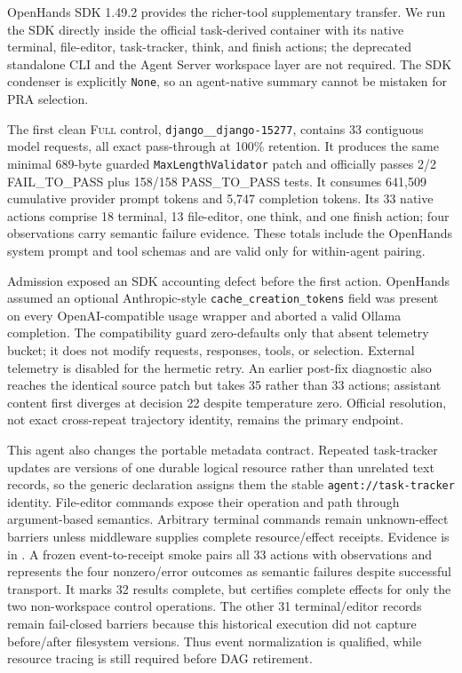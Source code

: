 \documentclass[11pt]{article}
\begin{document}
OpenHands SDK 1.49.2 provides the richer-tool supplementary transfer.  We run
the SDK directly inside the official task-derived container with its native
terminal, file-editor, task-tracker, think, and finish actions; the deprecated
standalone CLI and the Agent Server workspace layer are not required.  The SDK
condenser is explicitly \texttt{None}, so an agent-native summary cannot be
mistaken for PRA selection.

The first clean \textsc{Full} control, \texttt{django\_\_django-15277}, contains
33 contiguous model requests, all exact pass-through at 100\% retention.  It
produces the same minimal 689-byte guarded \texttt{MaxLengthValidator} patch
and officially passes 2/2 FAIL\_TO\_PASS plus 158/158 PASS\_TO\_PASS tests.
It consumes 641,509 cumulative provider prompt tokens and 5,747 completion
tokens.  Its 33 native actions comprise 18 terminal, 13 file-editor, one think,
and one finish action; four observations carry semantic failure evidence.
These totals include the OpenHands system prompt and tool schemas and are valid
only for within-agent pairing.

Admission exposed an SDK accounting defect before the first action.  OpenHands
assumed an optional Anthropic-style \texttt{cache\_creation\_tokens} field was
present on every OpenAI-compatible usage wrapper and aborted a valid Ollama
completion.  The compatibility guard zero-defaults only that absent telemetry
bucket; it does not modify requests, responses, tools, or selection.  External
telemetry is disabled for the hermetic retry.  An earlier post-fix diagnostic
also reaches the identical source patch but takes 35 rather than 33 actions;
assistant content first diverges at decision 22 despite temperature zero.
Official resolution, not exact cross-repeat trajectory identity, remains the
primary endpoint.

This agent also changes the portable metadata contract.  Repeated task-tracker
updates are versions of one durable logical resource rather than unrelated
text records, so the generic declaration assigns them the stable
\texttt{agent://task-tracker} identity.  File-editor commands expose their
operation and path through argument-based semantics.  Arbitrary terminal
commands remain unknown-effect barriers unless middleware supplies complete
resource/effect receipts.  Evidence is in
.  A frozen
event-to-receipt smoke pairs all 33 actions with observations and represents
the four nonzero/error outcomes as semantic failures despite successful
transport.  It marks 32 results complete, but certifies complete effects for
only the two non-workspace control operations.  The other 31 terminal/editor
records remain fail-closed barriers because this historical execution did not
capture before/after filesystem versions.  Thus event normalization is
qualified, while resource tracing is still required before DAG retirement.
\end{document}
